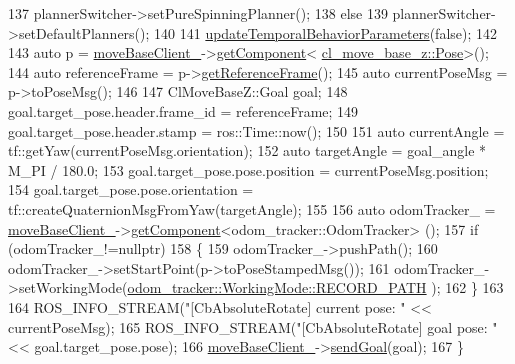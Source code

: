 \begin{DoxyCode}
137         plannerSwitcher->setPureSpinningPlanner();
138     \textcolor{keywordflow}{else}
139         plannerSwitcher->setDefaultPlanners();
140     
141     \hyperlink{classcl__move__base__z_1_1CbAbsoluteRotate_a2d8a4200dcacc00ad60c22ad2af5d4b2}{updateTemporalBehaviorParameters}(\textcolor{keyword}{false});
142 
143     \textcolor{keyword}{auto} p = \hyperlink{classcl__move__base__z_1_1CbMoveBaseClientBehaviorBase_ab2ef219464cfac8659b4a87c8d0db6d5}{moveBaseClient\_}->\hyperlink{classsmacc_1_1ISmaccClient_adef78db601749ca63c19e74a27cb88cc}{getComponent}<
      \hyperlink{classcl__move__base__z_1_1Pose}{cl\_move\_base\_z::Pose}>();
144     \textcolor{keyword}{auto} referenceFrame = p->\hyperlink{classcl__move__base__z_1_1Pose_af8c2dc151e74aa8da6b283d1c8563051}{getReferenceFrame}();
145     \textcolor{keyword}{auto} currentPoseMsg = p->toPoseMsg();
146 
147     ClMoveBaseZ::Goal goal;
148     goal.target\_pose.header.frame\_id = referenceFrame;
149     goal.target\_pose.header.stamp = ros::Time::now();
150 
151     \textcolor{keyword}{auto} currentAngle = tf::getYaw(currentPoseMsg.orientation);
152     \textcolor{keyword}{auto} targetAngle = goal\_angle * M\_PI / 180.0;
153     goal.target\_pose.pose.position = currentPoseMsg.position;
154     goal.target\_pose.pose.orientation = tf::createQuaternionMsgFromYaw(targetAngle);
155 
156     \textcolor{keyword}{auto} odomTracker\_ = \hyperlink{classcl__move__base__z_1_1CbMoveBaseClientBehaviorBase_ab2ef219464cfac8659b4a87c8d0db6d5}{moveBaseClient\_}->\hyperlink{classsmacc_1_1ISmaccClient_adef78db601749ca63c19e74a27cb88cc}{getComponent}<odom\_tracker::OdomTracker>
      ();
157     \textcolor{keywordflow}{if} (odomTracker\_!=\textcolor{keyword}{nullptr})
158     \{
159         odomTracker\_->pushPath();
160         odomTracker\_->setStartPoint(p->toPoseStampedMsg());
161         odomTracker\_->setWorkingMode(\hyperlink{namespacecl__move__base__z_1_1odom__tracker_ac46b05813b2791604f6cd0a39ace3ef8a023bc3adf68871ef7a0c616765ac80a7}{odom\_tracker::WorkingMode::RECORD\_PATH}
      );
162     \}
163 
164     ROS\_INFO\_STREAM(\textcolor{stringliteral}{"[CbAbsoluteRotate] current pose: "} << currentPoseMsg);
165     ROS\_INFO\_STREAM(\textcolor{stringliteral}{"[CbAbsoluteRotate] goal pose: "} << goal.target\_pose.pose);
166     \hyperlink{classcl__move__base__z_1_1CbMoveBaseClientBehaviorBase_ab2ef219464cfac8659b4a87c8d0db6d5}{moveBaseClient\_}->\hyperlink{classsmacc_1_1client__bases_1_1SmaccActionClientBase_a9c47a5094ac8afb01680307fe5eca922}{sendGoal}(goal);
167 \}
\end{DoxyCode}
